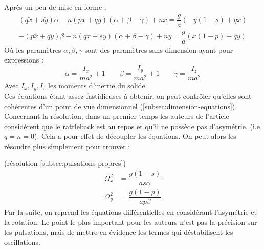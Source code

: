 \documentclass[12pt,a4paper]{article}
\begin{document}
	Après un peu de mise en forme : 
	\begin{align}
	\label{eq:equa-diff-couplées1}
	(q\ddot{x}+s\ddot{y})\alpha-n(p\dot{x}+q\dot{y})(\alpha+\beta-\gamma)+n\dot{x}=\dfrac{g}{a}(-y(1-s)+qx)\\
	\label{eq:equa-diff-couplées2}
	-(p\ddot{x}+q\ddot{y})\beta-n(q\dot{x}+s\dot{y})(\alpha+\beta-\gamma)+n\dot{y}=\dfrac{g}{a}(x(1-p)-qy)
	\end{align}
	Où les paramètres $\alpha,\beta,\gamma$ sont des paramètres sans dimension ayant pour expressions :
	\begin{equation*}
	\alpha=\dfrac{I_x}{ma^2}+1\qquad \beta=\dfrac{I_y}{ma^2}+1\qquad  \gamma=\dfrac{I_z}{ma^2}
	\end{equation*}
	Avec $I_x,I_y,I_z$ les moments d'inertie du solide.\\
	Ces équations étant assez fastidieuses à obtenir, on peut contrôler qu'elles sont cohérentes d'un point de vue dimensionnel (\autoref{subsec:dimension-equations}).\\
	
	Concernant la résolution, dans un premier temps les auteurs de l'article considèrent que le rattleback est au repos et qu'il ne possède pas d'asymétrie. (i.e $q=n=0$). Cela a pour effet de découpler les équations. On peut alors les résoudre plus simplement pour trouver : 
	
	(résolution \autoref{subsec:pulsations-propres}) \\
	\begin{align}
	\Omega_x^2&=\dfrac{g(1-s)}{as\alpha}\\[2ex]
	\Omega_y^2&=\dfrac{g(1-p)}{ap\beta}
	\end{align}
	Par la suite, on reprend les équations différentielles en considérant l'asymétrie et la rotation. Le point le plus important pour les auteurs n'est pas la précision sur les pulsations, mais de mettre en évidence les termes qui déstabilisent les oscillations.
	
\end{document}
